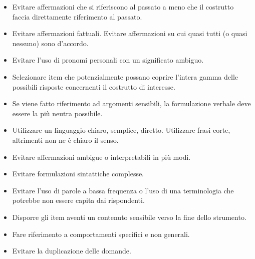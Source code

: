 \begin{itemize}
\item Evitare affermazioni che si riferiscono al passato a meno che il costrutto faccia direttamente riferimento al passato.

\item Evitare affermazioni fattuali. Evitare affermazioni su cui quasi tutti (o
quasi nessuno) sono d'accordo.

\item Evitare l'uso di pronomi personali con un significato ambiguo.

\item Selezionare item che potenzialmente possano coprire l'intera gamma delle possibili risposte concernenti il costrutto di interesse.  

\item Se viene fatto riferimento ad argomenti sensibili, la formulazione verbale deve essere la più neutra possibile.

\item Utilizzare un linguaggio chiaro, semplice, diretto. Utilizzare frasi corte, altrimenti non ne è chiaro il senso. 

\item Evitare affermazioni ambigue o interpretabili in più modi. 

\item Evitare formulazioni sintattiche complesse. 

\item Evitare l'uso di parole a bassa frequenza o l'uso di una terminologia che potrebbe non essere capita dai rispondenti.

\item Disporre gli item aventi un contenuto sensibile verso la fine dello strumento.

\item Fare riferimento a comportamenti specifici e
non generali.

\item Evitare la duplicazione delle domande.
\end{itemize}

